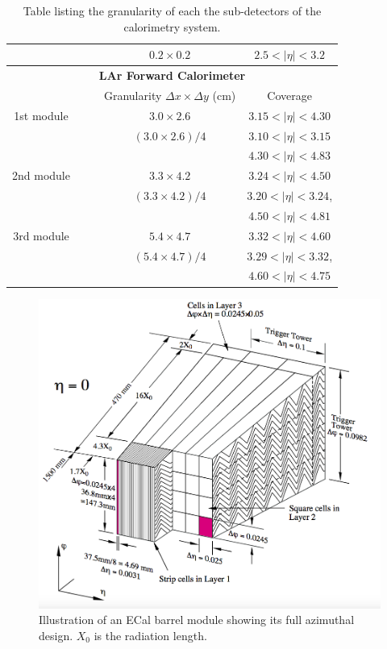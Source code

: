 \begin{table}
{{\begin{tabular}{|c|cc|cc|}
	 & & & $0.2 \times 0.2$ & $2.5 < | \eta | < 3.2$ \\ \hline
	 \multicolumn{5}{|c|}{\textbf{LAr Forward Calorimeter}} \\ \hline
	 & & & Granularity $\Delta x \times \Delta y$ (cm) & Coverage \\ \hline
	 1st module & & & $3.0 \times 2.6$ & $3.15 < | \eta | < 4.30$ \\
	 & & & $(3.0 \times 2.6)/4$ & $3.10 < | \eta | < 3.15$ \\
	 & & & & $4.30 < | \eta | < 4.83$ \\ \hline
	 2nd module & & & $3.3 \times 4.2$ & $3.24 < | \eta | < 4.50$ \\
	 & & & $(3.3 \times 4.2)/4$ & $3.20 < | \eta | < 3.24$, \\
	 & & & & $4.50 < | \eta | < 4.81$ \\ \hline
	 3rd module & & & $5.4 \times 4.7$ & $3.32 < | \eta | < 4.60$ \\
	 & & & $(5.4 \times 4.7)/4$ & $3.29 < | \eta | < 3.32$, \\
	 & & & & $4.60 < | \eta | < 4.75$ \\
	\hline
	\end{tabular}}}
	\caption{Table listing the granularity of each the sub-detectors of the calorimetry system. \cite{ATLAS}}
	\label{granularity}
\end{table}

\begin{figure}
\centering
\includegraphics[scale=0.4]{images/accordion_design.png}
\caption{Illustration of an ECal barrel module showing its full azimuthal design. $X_{0}$ is the radiation length. \cite{ATLAS}}
\label{accordion_design}
\end{figure}
